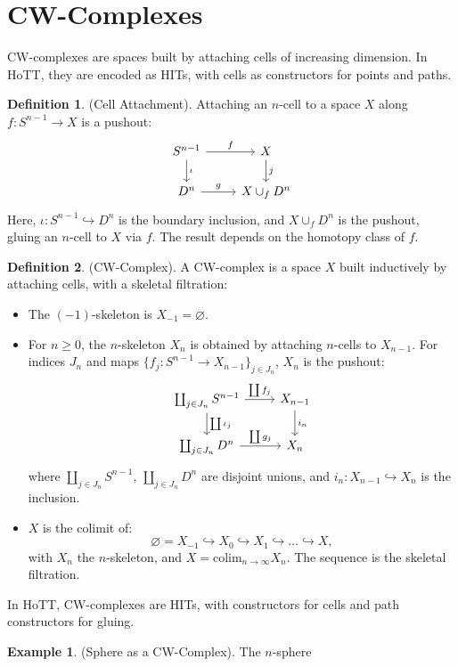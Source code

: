 \documentclass{article}
\theoremstyle{definition}
\newtheorem{definition}{Definition}
\newtheorem{example}{Example}
\newcommand*{\incmap}{\hookrightarrow}
\begin{document}
\section{CW-Complexes}
CW-complexes are spaces built by attaching cells of increasing
dimension. In HoTT, they are encoded as HITs, with cells as
constructors for points and paths.\begin{definition} (Cell Attachment).
Attaching an \( n \)-cell to a space \( X \) along \( f : S^{n-1} \to X \) is a pushout:
\[
\begin{tikzcd}
S^{n-1} \arrow[r, "f"] \arrow[d, "\iota"] & X \arrow[d, "j"] \\
D^n \arrow[r, "g"] & X \cup_f D^n
\end{tikzcd}
\]
Here, \( \iota : S^{n-1} \incmap D^n \) is the boundary
inclusion, and \( X \cup_f D^n \) is the pushout, gluing an
\( n \)-cell to \( X \) via \( f \). The result depends on the
homotopy class of \( f \).
\end{definition}\begin{definition} (CW-Complex). A CW-complex is a space \( X \)
built inductively by attaching cells, with a skeletal
filtration:
\begin{itemize}
    \item The \((-1)\)-skeleton is \( X_{-1} = \varnothing \).
    \item For \( n \geq 0 \), the \( n \)-skeleton \( X_n \) is
      obtained by attaching \( n \)-cells to \( X_{n-1} \). For
      indices \( J_n \) and maps \( \{ f_j : S^{n-1} \to X_{n-1}
      \}_{j \in J_n} \), \( X_n \) is the pushout:
    \[
    \begin{tikzcd}
    \coprod_{j \in J_n} S^{n-1} \arrow[r, "\coprod f_j"] \arrow[d, "\coprod \iota_j"] & X_{n-1} \arrow[d, "i_n"] \\
    \coprod_{j \in J_n} D^n \arrow[r, "\coprod g_j"] & X_n
    \end{tikzcd}
    \]
    where \( \coprod_{j \in J_n} S^{n-1} \), \( \coprod_{j \in
    J_n} D^n \) are disjoint unions, and \( i_n : X_{n-1}
    \incmap X_n \) is the inclusion.
    \item \( X \) is the colimit of:
    \[
    \varnothing = X_{-1} \incmap X_0 \incmap X_1 \incmap \dots
    \incmap X,
    \]
    with \( X_n \) the \( n \)-skeleton, and \( X = \text{colim}_{n
    \to \infty} X_n \). The sequence is the skeletal filtration.
\end{itemize}
In HoTT, CW-complexes are HITs, with constructors for cells and
path constructors for gluing.
\end{definition}\begin{example} (Sphere as a CW-Complex). The \( n \)-sphere

\end{example}
\end{document}

